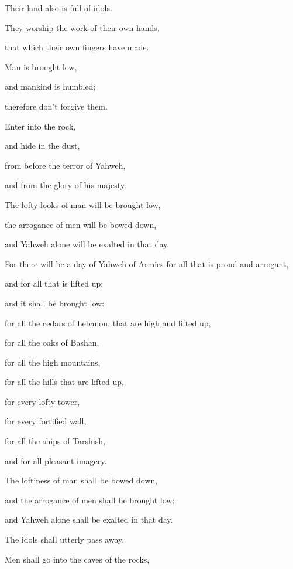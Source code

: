 {\par }{\Q {}Their land also is full of idols.
\par }{\QB They worship the work of their own hands,
\par }{\QB that which their own fingers have made.
\par }{\Q {}Man is brought low,
\par }{\QB and mankind is humbled;
\par }{\QB therefore don’t forgive them.
\par }{\Q {}Enter into the rock,
\par }{\QB and hide in the dust,
\par }{\Q from before the terror of Yahweh,
\par }{\QB and from the glory of his majesty.
\par }{\Q {}The lofty looks of man will be brought low,
\par }{\QB the arrogance of men will be bowed down,
\par }{\QB and Yahweh alone will be exalted in that day.
\par }{\BB \par }{\Q {}For there will be a day of Yahweh of Armies for all that is proud and arrogant,
\par }{\QB and for all that is lifted up;
\par }{\QB and it shall be brought low:
\par }{\QB {}for all the cedars of Lebanon, that are high and lifted up,
\par }{\QB for all the oaks of Bashan,
\par }{\QB {}for all the high mountains,
\par }{\QB for all the hills that are lifted up,
\par }{\QB {}for every lofty tower,
\par }{\QB for every fortified wall,
\par }{\QB {}for all the ships of Tarshish,
\par }{\QB and for all pleasant imagery.
\par }{\Q {}The loftiness of man shall be bowed down,
\par }{\QB and the arrogance of men shall be brought low;
\par }{\QB and Yahweh alone shall be exalted in that day.
\par }{\Q {}The idols shall utterly pass away.
\par }{\Q {}Men shall go into the caves of the rocks,
}
